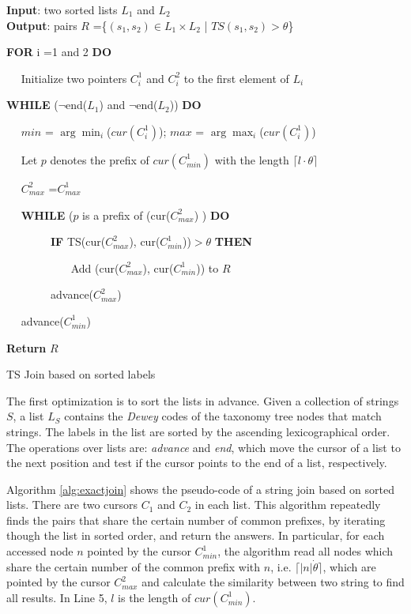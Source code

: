 \begin{algorithm}
{\bf Input}: two sorted lists  $L_1$ and $L_2$\\
{\bf Output}: pairs $R$ =\{$(s_1,s_2) \in L_1 \times L_2$ | $TS(s_1, s_2) > \theta$\}
\begin{compactenum}[(1)]
\item {\bf FOR}  i =1 and 2 {\bf DO}
\item ~~ Initialize two pointers $C_i^1$ and $C_i^2$ to the first element of  $L_i$
\item {\bf WHILE}  ($\neg$end($L_1$) and $\neg$end($L_2$)) {\bf DO}
\item ~~ $min$ = $\arg\min_{i}$($cur(C_i^1)$); $max$ = $\arg\max_{i}$($cur(C_i^1)$)
\item ~~ Let $p$ denotes the prefix of $cur(C_{min}^1)$ with the length $  \lceil l \cdot \theta \rceil$
\item ~~ $C_{max}^2$ =$C_{max}^1$
\item ~~ {\bf WHILE} ($p$ is a prefix of (cur($C_{max}^2$) ) {\bf DO}
\item ~~ ~~ ~~ {\bf IF} TS(cur($C_{max}^2$), cur($C_{min}^1$))$> \theta$ {\bf THEN}
\item ~~~   ~~ ~~ ~~ Add (cur($C_{max}^2$), cur($C_{min}^1$)) to $R$
\item ~~ ~~ ~~ advance($C_{max}^2$)
\item ~~   advance($C_{min}^1$)
\item  {\bf Return} $R$
\end{compactenum}
\caption{TS Join based on sorted labels}
\label{alg:exactjoin}
\end{algorithm}





The first optimization is to sort the lists in advance. Given a collection of strings $S$,  a list $L_S$ contains the \textit{Dewey} codes of the taxonomy tree nodes that match strings. The labels in the list are sorted by the ascending lexicographical order. The operations over lists are: \textit{advance} and \textit{end}, which move the cursor of a list to the next position and test if the cursor points to the end of a list, respectively.



Algorithm \ref{alg:exactjoin} shows the pseudo-code of a string join based on sorted lists. There are two cursors $C_1$ and $C_2$ in each list. This algorithm repeatedly finds the pairs that share the certain number of common prefixes, by iterating though the list in sorted order, and return the answers. In particular,  for each accessed node $n$ pointed by the cursor $C^1_{min}$, the algorithm read all nodes  which share the certain number of the common prefix with $n$, i.e. $ \lceil |n| \dot \theta \rceil$, which are pointed by the cursor $C^2_{max}$ and calculate the similarity between two string to find all results. In Line 5, $l$ is the length of  $cur(C^1_{min})$.

